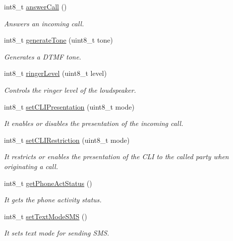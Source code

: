 \begin{DoxyCompactItemize}
int8\+\_\+t \hyperlink{class_wasp3_g_aa4243cfe0a8c86c70f4be04fa8d8ff1b}{answer\+Call} ()
\begin{DoxyCompactList}\small\item\em Answers an incoming call. \end{DoxyCompactList}\item 
int8\+\_\+t \hyperlink{class_wasp3_g_a2565afc4f0a24d72a21fb14d9f1533cb}{generate\+Tone} (uint8\+\_\+t tone)
\begin{DoxyCompactList}\small\item\em Generates a D\+T\+MF tone. \end{DoxyCompactList}\item 
int8\+\_\+t \hyperlink{class_wasp3_g_aa032497869c36d4f695fa25196f0b4a8}{ringer\+Level} (uint8\+\_\+t level)
\begin{DoxyCompactList}\small\item\em Controls the ringer level of the loudspeaker. \end{DoxyCompactList}\item 
int8\+\_\+t \hyperlink{class_wasp3_g_a21d12e0288e33454244c1fd2a1846493}{set\+C\+L\+I\+Presentation} (uint8\+\_\+t mode)
\begin{DoxyCompactList}\small\item\em It enables or disables the presentation of the incoming call. \end{DoxyCompactList}\item 
int8\+\_\+t \hyperlink{class_wasp3_g_afa1f1442b5d2b474db34478c4ff8caf1}{set\+C\+L\+I\+Restriction} (uint8\+\_\+t mode)
\begin{DoxyCompactList}\small\item\em It restricts or enables the presentation of the C\+LI to the called party when originating a call. \end{DoxyCompactList}\item 
int8\+\_\+t \hyperlink{class_wasp3_g_a105bba438a77f4f43a37c4327254b2fc}{get\+Phone\+Act\+Status} ()
\begin{DoxyCompactList}\small\item\em It gets the phone activity status. \end{DoxyCompactList}\item 
int8\+\_\+t \hyperlink{class_wasp3_g_acf89bcbdbaf7be30b438ea28f84c134a}{set\+Text\+Mode\+S\+MS} ()
\begin{DoxyCompactList}\small\item\em It sets \textquotesingle{}text mode\textquotesingle{} for sending S\+MS. \end{DoxyCompactList}\item 

\end{DoxyCompactItemize}
